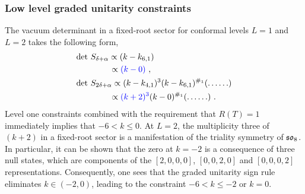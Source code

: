 \subsubsection{Low level graded unitarity constraints}
The vacuum determinant in a fixed-root sector for conformal levels $L = 1$ and $L = 2$ takes the following form, 
\begin{equation} \label{eq:lowlevelso8det1to2}
\begin{split}
    &\text{det}~S_{\delta + \alpha} \propto (k-k_{6,1}) \\
    &\qquad \qquad \propto \textcolor{blue}{(k - 0)}~, \\
    &\text{det}~S_{2\delta + \alpha} \propto (k - k_{4,1})^3(k-k_{6,1})^{\#_1} (\ldots \ldots)\\ 
    &\qquad \qquad  \propto \textcolor{blue}{(k + 2)^3}(k - 0)^{\#_1} (\ldots \ldots)~. \\ 
\end{split}
\end{equation}
Level one constraints combined with the requirement that $R(T) = 1$ immediately implies that $-6 < k \leqslant 0$. 
At $L = 2$, the multiplicity three of $(k+2)$ in a fixed-root sector is a manifestation of the triality symmetry of $\mathfrak{so}_8$. In particular, it can be shown that the zero at $k = -2$ is a consequence of three null states, which are components of the $[2,0,0,0]$, $[0,0,2,0]$ and $[0,0,0,2]$ representations. Consequently, one sees that the graded unitarity sign rule eliminates $k \in (-2,0)$, leading to the constraint $-6<k \leqslant -2$ or $k = 0$. 

